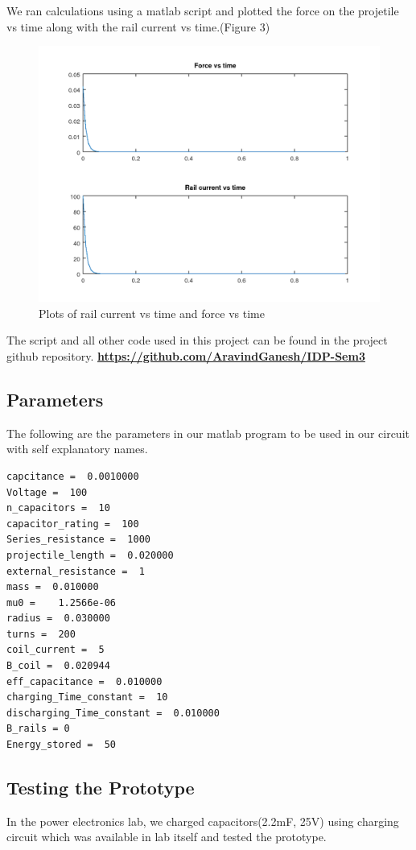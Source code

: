 \documentclass[twoside,twocolumn]{article}
\begin{document}
	
We ran calculations using a matlab script and plotted the force on the projetile vs time along with the rail current vs time.(Figure 3)

\begin{figure}[h]
	\caption{Plots of rail current vs time and force vs time}
	\includegraphics[width=\linewidth]{plots.png}
\end{figure}
		The script and all other code used in this project can be found in the project github repository.
\href{https://github.com/AravindGanesh/IDP-Sem3}{\textbf{https://github.com/AravindGanesh/IDP-Sem3}}
\subsection*{\textbf{Parameters}}

The following are the parameters in our matlab program  to be used in our circuit with self explanatory names. 

\begin{lstlisting}[frame=single]
capcitance =  0.0010000
Voltage =  100
n_capacitors =  10
capacitor_rating =  100
Series_resistance =  1000
projectile_length =  0.020000
external_resistance =  1
mass =  0.010000
mu0 =    1.2566e-06
radius =  0.030000
turns =  200
coil_current =  5
B_coil =  0.020944
eff_capacitance =  0.010000
charging_Time_constant =  10
discharging_Time_constant =  0.010000
B_rails = 0
Energy_stored =  50
\end{lstlisting}




\subsection*{Testing the Prototype}
In the power electronics lab,
we charged capacitors(2.2mF, 25V) using charging circuit which was available in lab itself and tested the prototype.
\end{document}
